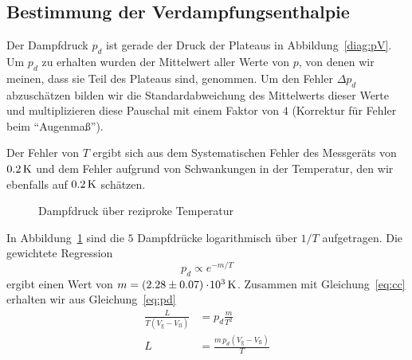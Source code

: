 \subsection{Bestimmung der Verdampfungsenthalpie}

Der Dampfdruck $p_d$ ist gerade der Druck der Plateaus in Abbildung~\ref{diag:pV}. Um $p_d$ zu erhalten wurden der Mittelwert aller Werte von $p$, von denen wir meinen, dass sie Teil des Plateaus sind, genommen. Um den Fehler $\Delta p_d$ abzuschätzen bilden wir die Standardabweichung des Mittelwerts dieser Werte und multiplizieren diese Pauschal mit einem Faktor von $4$ (Korrektur für Fehler beim "`Augenmaß"'). 

Der Fehler von $T$ ergibt sich aus dem Systematischen Fehler des Messgeräts von $\unit[0.2]{K}$ und dem Fehler aufgrund von Schwankungen in der Temperatur, den wir ebenfalls auf $\unit[0.2]{K}$ schätzen.

\begin{figure}    
    
    \caption{Dampfdruck über reziproke Temperatur}
    \label{diag:arr}
\end{figure}

In Abbildung~\ref{diag:arr} sind die $5$ Dampfdrücke logarithmisch über $1/T$ aufgetragen. Die gewichtete Regression
%
\begin{equation}
p_d \propto e^{-m/T} \label{eq:pd}
\end{equation}
%
ergibt einen Wert von $m = \unit[(2.28 \pm 0.07)\e3]{K}$. Zusammen mit Gleichung~\ref{eq:cc} erhalten wir aus Gleichung~\ref{eq:pd}
\begin{align*}
    \frac{L}{T (V_\mathrm{g} - V_\mathrm{fl})} &= p_d \frac{m}{T^2} \\
                                             L &= \frac{m \, p_d (V_\mathrm{g} - V_\mathrm{fl})}{T}
\end{align*}


